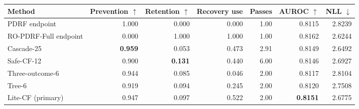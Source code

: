 \begin{tabular}{lrrrrrr}
\toprule
Method & Prevention $\uparrow$ & Retention $\uparrow$ & Recovery use & Passes & AUROC $\uparrow$ & NLL $\downarrow$ \\
\midrule
PDRF endpoint & 1.000 & 0.000 & 0.000 & 1.00 & 0.8115 & 2.8239 \\
RO-PDRF-Full endpoint & 0.000 & 1.000 & 1.000 & 1.00 & 0.8162 & 2.6244 \\
Cascade-25 & \textbf{0.959} & 0.053 & 0.473 & 2.91 & 0.8149 & 2.6492 \\
Safe-CF-12 & 0.900 & \textbf{0.131} & 0.440 & 6.00 & 0.8146 & 2.6927 \\
Three-outcome-6 & 0.944 & 0.085 & 0.046 & 2.00 & 0.8117 & 2.8104 \\
Tree-6 & 0.919 & 0.094 & 0.245 & 2.00 & 0.8120 & 2.7508 \\
Lite-CF (primary) & 0.947 & 0.097 & 0.522 & 2.00 & \textbf{0.8151} & 2.6775 \\
\bottomrule
\end{tabular}
